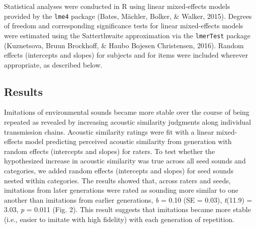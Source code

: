 \documentclass[english,floatsintext,man]{apa6}
\theoremstyle{definition}
\theoremstyle{definition}
\theoremstyle{definition}
\theoremstyle{remark}
\begin{document}
Statistical analyses were conducted in R using linear mixed-effects
models provided by the \texttt{lme4} package (Bates, Mächler, Bolker, \&
Walker, 2015). Degrees of freedom and corresponding significance tests
for linear mixed-effects models were estimated using the Satterthwaite
approximation via the \texttt{lmerTest} package (Kuznetsova, Bruun
Brockhoff, \& Haubo Bojesen Christensen, 2016). Random effects
(intercepts and slopes) for subjects and for items were included
wherever appropriate, as described below.

\hypertarget{results}{%
\subsection{Results}\label{results}}

Imitations of environmental sounds became more stable over the course of
being repeated as revealed by increasing acoustic similarity judgments
along individual transmission chains. Acoustic similarity ratings were
fit with a linear mixed-effects model predicting perceived acoustic
similarity from generation with random effects (intercepts and slopes)
for raters. To test whether the hypothesized increase in acoustic
similarity was true across all seed sounds and categories, we added
random effects (intercepts and slopes) for seed sounds nested within
categories. The results showed that, across raters and seeds, imitations
from later generations were rated as sounding more similar to one
another than imitations from earlier generations, \emph{b} = 0.10 (SE =
0.03), \emph{t}(11.9) = 3.03, \emph{p} = 0.011 (Fig. 2). This result
suggests that imitations became more stable (i.e., easier to imitate
with high fidelity) with each generation of repetition.
\end{document}
